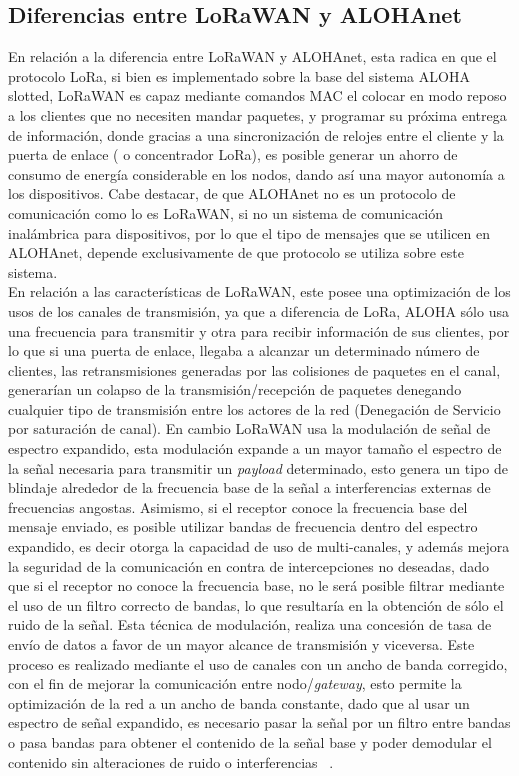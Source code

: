 \begin{justify}
\section{Diferencias entre LoRaWAN y ALOHAnet}
En relación a la diferencia entre LoRaWAN y ALOHAnet, esta radica en que el protocolo LoRa, si bien es implementado sobre la base del sistema ALOHA slotted, LoRaWAN es capaz mediante comandos MAC el colocar en modo reposo a los clientes que no necesiten mandar paquetes, y programar su próxima entrega de información, donde gracias a una sincronización de relojes entre el cliente y la puerta de enlace ( o concentrador LoRa), es posible generar un ahorro de consumo de energía considerable en los nodos, dando así una mayor autonomía a los dispositivos. Cabe destacar, de que ALOHAnet no es un protocolo de comunicación como lo es LoRaWAN, si no un sistema de comunicación inalámbrica para dispositivos, por lo que el tipo de mensajes que se utilicen en ALOHAnet, depende exclusivamente de que protocolo se utiliza sobre este sistema.\\
 En relación a las características de LoRaWAN, este posee una optimización de los usos de los canales de transmisión, ya que a diferencia de LoRa, ALOHA sólo usa una frecuencia para transmitir y otra para recibir información de sus clientes, por lo que si una puerta de enlace, llegaba a alcanzar un determinado número de clientes, las retransmisiones generadas por las colisiones de paquetes en el canal, generarían un colapso de la transmisión/recepción de paquetes denegando cualquier tipo de transmisión entre los actores de la red (Denegación de Servicio por saturación de canal). En cambio LoRaWAN usa la modulación de señal de espectro expandido, esta modulación expande a un mayor tamaño el espectro de la señal necesaria para transmitir un \textit{payload} determinado, esto genera un tipo de blindaje alrededor de la frecuencia base de la señal a interferencias externas de frecuencias angostas. Asimismo, si el receptor conoce la frecuencia base del mensaje enviado, es posible utilizar bandas de frecuencia dentro del espectro expandido, es decir otorga la capacidad de uso de multi-canales, y además mejora la seguridad de la comunicación en contra de intercepciones no deseadas, dado que si el receptor no conoce la frecuencia base, no le será posible filtrar mediante el uso de un filtro correcto de bandas, lo que resultaría en la obtención de sólo el ruido de la señal. Esta técnica de modulación, realiza una concesión de tasa de envío de datos a favor de un mayor alcance de transmisión y viceversa. Este proceso es realizado mediante el uso de canales con un ancho de banda corregido, con el fin de mejorar la comunicación entre nodo/\textit{gateway}, esto permite la optimización de la red a un ancho de banda constante, dado que al usar un espectro de señal expandido, es necesario pasar la señal por un filtro entre bandas o pasa bandas para obtener el contenido de la señal base y poder demodular el contenido sin alteraciones de ruido o interferencias ~\cite{modulation}.


\end{justify}
